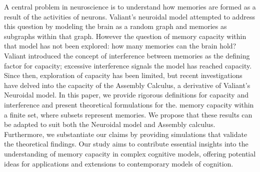 A central problem in neuroscience is to understand how memories are formed as a result of the activities of neurons. Valiant’s neuroidal model attempted to address this question by modeling the brain as a random graph and memories as subgraphs within that graph. However the question of memory capacity within that model has not been explored: how many memories can the brain hold? Valiant introduced the concept of interference between memories as the defining factor for capacity; excessive interference signals the model has reached capacity. Since then, exploration of capacity has been limited, but recent investigations have delved into the capacity of the Assembly Calculus, a derivative of Valiant's Neuroidal model. In this paper, we provide rigorous definitions for capacity and interference and present theoretical formulations for the. memory capacity within a finite set, where subsets represent memories. We propose that these results can be adapted to suit both the Neuroidal model and Assembly calculus. Furthermore, we substantiate our claims by providing simulations that validate the theoretical findings. Our study aims to contribute essential insights into the understanding of memory capacity in complex cognitive models, offering potential ideas for applications and extensions to contemporary models of cognition.